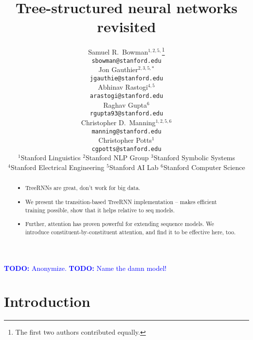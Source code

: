 \documentclass[11pt,letterpaper]{article}
\title{Tree-structured neural networks revisited}
\author{
Samuel R.\ Bowman$^{1,2,5,}$\thanks{The first two authors contributed equally.} \\
\texttt{\small sbowman@stanford.edu} \\
\And
Jon Gauthier$^{2,3,5,*}$ \\
\texttt{\small jgauthie@stanford.edu} \\
\And
Abhinav Rastogi$^{4,5}$ \\
\texttt{\small arastogi@stanford.edu} \\
\AND
Raghav Gupta$^{6}$ \\
\texttt{\small rgupta93@stanford.edu} \\
\And
Christopher D.\ Manning$^{1,2,5,6}$\\
\texttt{\small manning@stanford.edu}\\
\And
Christopher Potts$^{1}$\\
\texttt{\small cgpotts@stanford.edu}
\AND\\[-3ex]
{$^{1}$Stanford Linguistics\quad
$^{2}$Stanford NLP Group\quad
$^{3}$Stanford Symbolic Systems}\\
{$^{4}$Stanford Electrical Engineering\quad
$^{5}$Stanford AI Lab\quad
$^{6}$Stanford Computer Science}
}
\date{}
\newcommand\todo[1]{\textcolor{blue}{\textbf{TODO:} #1}}
\begin{document}
\maketitle
\begin{abstract}
\begin{itemize}
\item TreeRNNs are great, don't work for big data.
\item We present the transition-based TreeRNN implementation -- makes efficient training possible, show that it helps relative to seq models.
\item Further, attention has proven powerful for extending sequence models. We introduce constituent-by-constituent attention, and find it to be effective here, too.
\end{itemize}
\end{abstract}

\todo{Anonymize.}
\todo{Name the damn model!}

\section{Introduction}


\end{document}
